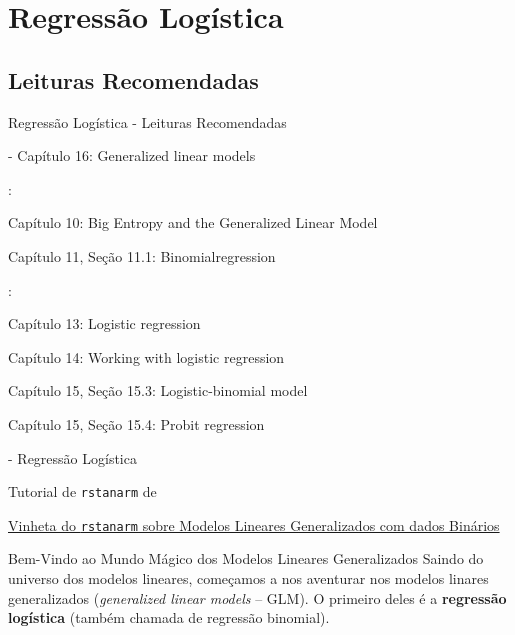 \section{Regressão Logística}

\subsection{Leituras Recomendadas}
\begin{frame}{Regressão Logística - Leituras Recomendadas}
	\begin{vfilleditems}
		\item \textcite{gelman2013bayesian} - Capítulo 16: Generalized linear models
		\item \textcite{mcelreath2020statistical}:
		\begin{vfilleditems}
			\item Capítulo 10: Big Entropy and the Generalized Linear Model
			\item Capítulo 11, Seção 11.1: Binomialregression
		\end{vfilleditems}
		\item \textcite{gelman2020regression}:
		\begin{vfilleditems}
			\item Capítulo 13: Logistic regression
			\item Capítulo 14: Working with logistic regression
			\item Capítulo 15, Seção 15.3: Logistic-binomial model
			\item Capítulo 15, Seção 15.4: Probit regression
		\end{vfilleditems}
		\item \textcite{storopoli2021estatisticabayesianaR} - Regressão Logística
		\item Tutorial de \texttt{rstanarm} de \textcite{muth2018user}
		\item \href{http://mc-stan.org/rstanarm/articles/binomial.html}{Vinheta do \texttt{rstanarm} sobre Modelos Lineares Generalizados com dados Binários}
	\end{vfilleditems}
\end{frame}

\begin{frame}{Bem-Vindo ao Mundo Mágico dos Modelos Lineares Generalizados}
	Saindo do universo dos modelos lineares, começamos a nos aventurar nos modelos
	linares generalizados (\textit{generalized linear models} -- GLM).
	\vfill
	O primeiro deles é a \textbf{regressão logística}
	(também chamada de regressão binomial).
\end{frame}

